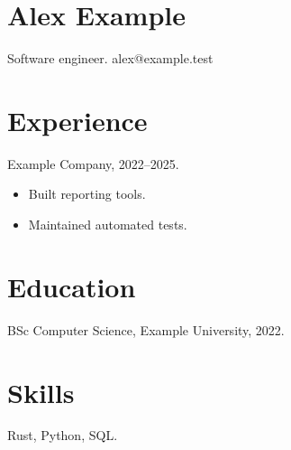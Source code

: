 \documentclass{article}
\begin{document}
\section*{Alex Example}
Software engineer. alex@example.test
\section*{Experience}
Example Company, 2022--2025.
\begin{itemize}
\item Built reporting tools.
\item Maintained automated tests.
\end{itemize}
\section*{Education}
BSc Computer Science, Example University, 2022.
\section*{Skills}
Rust, Python, SQL.
\end{document}
